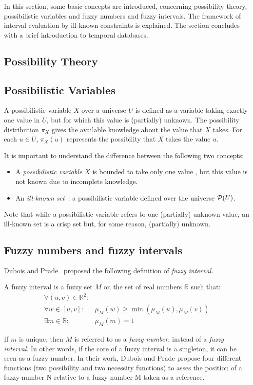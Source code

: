 In this section, some basic concepts are introduced, concerning possibility theory, possibilistic variables and fuzzy numbers and fuzzy intervals. The framework of interval evaluation by ill-known constraints is explained. The section concludes with a brief introduction to temporal databases.

\subsection{\label{subsec:possibility-theory}Possibility Theory}


\subsection{\label{subsec:possibilistic-variables}Possibilistic Variables}
A possibilistic variable $X$ over a universe $U$ is defined as a variable taking exactly one value in $U$, but for which this value is (partially) unknown. The possibility distribution $\pi_X$ gives the available knowledge about the value that $X$ takes. For each $u\in U$, $\pi_X(u)$ represents the possibility that $X$ takes the value $u$.

It is important to understand the difference between the following two concepts:
\begin{itemize}
\item
A \emph{possibilistic variable} $X$ is bounded to take only one value , but this value is not known due to incomplete knowledge. 
\item
An \emph{ill-known set}~\cite{Dubois88b}: a possibilistic variable defined over the universe $\mathcal{P}(U)$.
\end{itemize}

Note that while a possibilistic variable refers to one (partially) unknown value, an ill-known set is a crisp set but, for some reason, (partially) unknown.


\subsection{\label{subsec:fuzzy-numbers}Fuzzy numbers and fuzzy intervals}
Dubois and Prade~\cite{Dubois1983} proposed the following definition of \emph{fuzzy interval}.
\begin{definition}
A fuzzy interval is a fuzzy set $M$ on the set of real numbers $\mathbb{R}$ such that:
\begin{eqnarray}
\forall (u,v)\in\mathbb{R}^2:&\\
\nonumber
\forall w \in [u,v]:&\mu_M(w) \geq\min(\mu_M(u),\mu_M(v))  \\
\exists m \in \mathbb{R}:& \mu_M(m)=1 
\end{eqnarray}
\end{definition}
If $m$ is unique, then $M$ is referred to as a \emph{fuzzy number}, instead of a \emph{fuzzy interval}. In other words, if the core of a fuzzy interval is a singleton, it can be seen as a fuzzy number. In their work, Dubois and Prade propose four different functions (two possibility and two necessity functions) to asses the position of a fuzzy number N relative to  a fuzzy number M taken as a reference.

